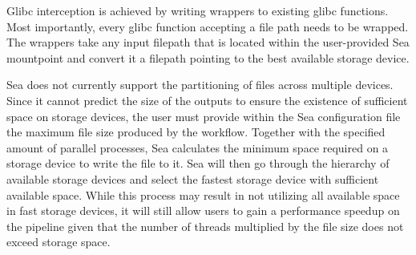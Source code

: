 Glibc interception is achieved by writing wrappers to existing glibc functions.
Most importantly, every glibc function accepting a file path needs to be
wrapped. The wrappers take any input filepath that is located within the
user-provided Sea mountpoint and convert it a filepath pointing to the best
available storage device.

Sea does not currently support the partitioning of files across multiple
devices. Since it cannot predict the size of the outputs to ensure the existence
of sufficient space on storage devices, the user must provide within the Sea
configuration file the maximum file size produced by the workflow. Together with
the specified amount of parallel processes, Sea calculates the minimum space
required on a storage device to write the file to it.
Sea will then go through the hierarchy of available storage devices and select
the fastest storage device with sufficient available space. While this process
may result in not utilizing all available space in fast storage devices, it will
still allow users to gain a performance speedup on the pipeline given that the
number of threads multiplied by the file size does not exceed storage space.




